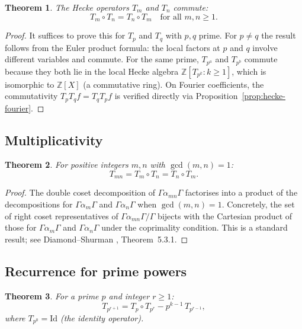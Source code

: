 \documentclass[12pt,a4paper]{amsart}
\newtheorem{theorem}{Theorem}[section]
\theoremstyle{definition}
\begin{document}
\begin{theorem}\label{thm:commute}
  The Hecke operators $T_m$ and $T_n$ commute:
  \[
    T_m \circ T_n = T_n \circ T_m \quad \text{for all } m,n \ge 1.
  \]
\end{theorem}

\begin{proof}
  It suffices to prove this for $T_p$ and $T_q$ with $p,q$ prime.
  For $p \ne q$ the result follows from the Euler product formula: the
  local factors at $p$ and $q$ involve different variables and commute.
  For the same prime, $T_{p^a}$ and $T_{p^b}$ commute because they both
  lie in the local Hecke algebra $\mathbb{Z}[T_{p^k} : k \ge 1]$, which
  is isomorphic to $\mathbb{Z}[X]$ (a commutative ring).
  On Fourier coefficients, the commutativity $T_p T_q f = T_q T_p f$
  is verified directly via Proposition~\ref{prop:hecke-fourier}.
\end{proof}

\subsection{Multiplicativity}

\begin{theorem}\label{thm:mult}
  For positive integers $m,n$ with $\gcd(m,n) = 1$:
  \[
    T_{mn} = T_m \circ T_n = T_n \circ T_m.
  \]
\end{theorem}

\begin{proof}
  The double coset decomposition of $\Gamma \alpha_{mn} \Gamma$ factorises
  into a product of the decompositions for $\Gamma \alpha_m \Gamma$ and
  $\Gamma \alpha_n \Gamma$ when $\gcd(m,n) = 1$. Concretely, the set of
  right coset representatives of $\Gamma \alpha_{mn} \Gamma / \Gamma$
  bijects with the Cartesian product of those for $\Gamma \alpha_m\Gamma$
  and $\Gamma \alpha_n\Gamma$ under the coprimality condition. This is a
  standard result; see Diamond--Shurman \cite{DiamondShurman}, Theorem~5.3.1.
\end{proof}

\subsection{Recurrence for prime powers}

\begin{theorem}\label{thm:recurrence}
  For a prime $p$ and integer $r \ge 1$:
  \[
    T_{p^{r+1}} = T_p \circ T_{p^r} - p^{k-1}\, T_{p^{r-1}},
  \]
  where $T_{p^0} = \mathrm{Id}$ (the identity operator).
\end{theorem}
\end{document}
